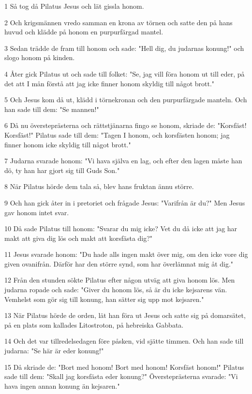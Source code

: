\par 1 Så tog då Pilatus Jesus och lät gissla honom.
\par 2 Och krigsmännen vredo samman en krona av törnen och satte den på hans huvud och klädde på honom en purpurfärgad mantel.
\par 3 Sedan trädde de fram till honom och sade: "Hell dig, du judarnas konung!" och slogo honom på kinden.
\par 4 Åter gick Pilatus ut och sade till folket: "Se, jag vill föra honom ut till eder, på det att I mån förstå att jag icke finner honom skyldig till något brott."
\par 5 Och Jesus kom då ut, klädd i törnekronan och den purpurfärgade manteln. Och han sade till dem: "Se mannen!"
\par 6 Då nu översteprästerna och rättstjänarna fingo se honom, skriade de: "Korsfäst! Korsfäst!" Pilatus sade till dem: "Tagen I honom, och korsfästen honom; jag finner honom icke skyldig till något brott."
\par 7 Judarna svarade honom: "Vi hava själva en lag, och efter den lagen måste han dö, ty han har gjort sig till Guds Son."
\par 8 När Pilatus hörde dem tala så, blev hans fruktan ännu större.
\par 9 Och han gick åter in i pretoriet och frågade Jesus: "Varifrån är du?" Men Jesus gav honom intet svar.
\par 10 Då sade Pilatus till honom: "Svarar du mig icke? Vet du då icke att jag har makt att giva dig lös och makt att korsfästa dig?"
\par 11 Jesus svarade honom: "Du hade alls ingen makt över mig, om den icke vore dig given ovanifrån. Därför har den större synd, som har överlämnat mig åt dig."
\par 12 Från den stunden sökte Pilatus efter någon utväg att giva honom lös. Men judarna ropade och sade: "Giver du honom lös, så är du icke kejsarens vän. Vemhelst som gör sig till konung, han sätter sig upp mot kejsaren."
\par 13 När Pilatus hörde de orden, lät han föra ut Jesus och satte sig på domarsätet, på en plats som kallades Litostroton, på hebreiska Gabbata.
\par 14 Och det var tillredelsedagen före påsken, vid sjätte timmen. Och han sade till judarna: "Se här är eder konung!"
\par 15 Då skriade de: "Bort med honom! Bort med honom! Korsfäst honom!" Pilatus sade till dem: "Skall jag korsfästa eder konung?" Översteprästerna svarade: "Vi hava ingen annan konung än kejsaren."
